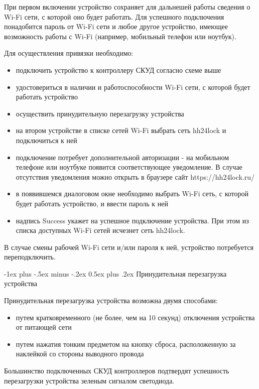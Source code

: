 \documentclass[a4paper,10pt,landscape]{article}
\makeatletter
\renewcommand{\section}{\@startsection{section}{1}{0mm}%
                                {-1ex plus -.5ex minus -.2ex}%
                                {0.5ex plus .2ex}%
                                {\normalfont\large\bfseries}}
\makeatother
\begin{document}
\begin{multicols}{3}
При первом включении устройство сохраняет для дальнешей работы сведения о Wi-Fi сети, с которой оно будет работать. Для успешного подключения понадобится пароль от Wi-Fi сети и любое другое устройство, имеющее возможность работы с Wi-Fi (например, мобильный телефон или ноутбук).

Для осуществления привязки необходимо:

\begin{itemize}
  \item подключить устройство к контроллеру СКУД согласно схеме выше 
  \item удостовериться в наличии и работоспособности Wi-Fi сети, с которой будет работать устройство
  \item осуществить принудительную перезагрузку устройства 
  \item на втором устройстве в списке сетей Wi-Fi выбрать сеть hh24lock и подключиться к ней
  \item подключение потребует дополнительной авторизации - на мобильном телефоне или ноутбуке появится соответствующее уведомление. В случае отсутствия уведомления можно открыть в браузере сайт https://hh24lock.ru/ 
  \item в появившемся диалоговом окне необходимо выбрать Wi-Fi сеть, с которой будет работать устройство, и ввести пароль к ней
  \item надпись Success укажет на успешное подключение устройства. При этом из списка доступных Wi-Fi сетей исчезнет сеть hh24lock.
\end{itemize}

В случае смены рабочей Wi-Fi сети и/или пароля к ней, устройство потребуется переподключить. 

\section{Принудительная перезагрузка устройства}

Принудительная перезагрузка устройства возможна двумя способами:  

\begin{itemize} 
  \item путем кратковременного (не более, чем на 10 секунд) отключения устройства от питающей сети 
  \item путем нажатия тонким предметом на кнопку сброса, расположенную за наклейкой со стороны выводного провода
\end{itemize}

Большинство подключенных СКУД контроллеров подтвердят успешность перезагрузки устройства зеленым сигналом светодиода. 


\end{multicols}
\end{document}
